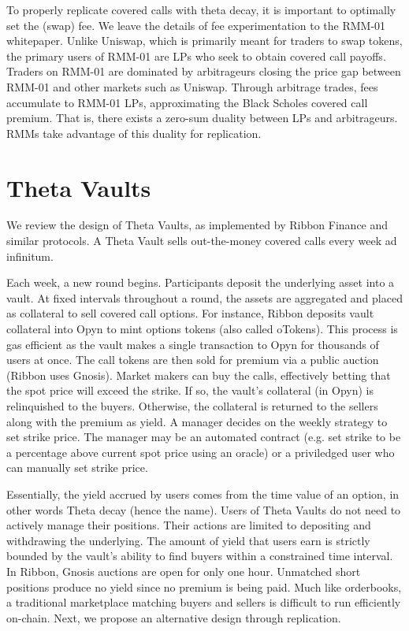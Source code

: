 \documentclass[hidelinks, 12pt]{article}
\begin{document}
To properly replicate covered calls with theta decay, it is important to optimally set the (swap) fee. We leave the details of fee experimentation to the RMM-01 whitepaper. Unlike Uniswap, which is primarily meant for traders to swap tokens, the primary users of RMM-01 are LPs who seek to obtain covered call payoffs. Traders on RMM-01 are dominated by arbitrageurs closing the price gap between RMM-01 and other markets such as Uniswap. Through arbitrage trades, fees accumulate to RMM-01 LPs, approximating the Black Scholes covered call premium. That is, there exists a zero-sum duality between LPs and arbitrageurs. RMMs take advantage of this duality for replication.

\section{Theta Vaults}
\label{sec:theta}

We review the design of Theta Vaults, as implemented by Ribbon Finance and similar protocols. A Theta Vault sells out-the-money covered calls every week ad infinitum.

Each week, a new round begins. Participants deposit the underlying asset into a vault. At fixed intervals throughout a round, the assets are aggregated and placed as collateral to sell covered call options. For instance, Ribbon deposits vault collateral into Opyn to mint options tokens (also called oTokens). This process is gas efficient as the vault makes a single transaction to Opyn for thousands of users at once. The call tokens are then sold for premium via a public auction (Ribbon uses Gnosis). Market makers can buy the calls, effectively betting that the spot price will exceed the strike. If so, the vault's collateral (in Opyn) is relinquished to the buyers. Otherwise, the collateral is returned to the sellers along with the premium as yield.
A manager decides on the weekly strategy to set strike price. The manager may be an automated contract (e.g. set strike to be a percentage above current spot price using an oracle) or a priviledged user who can manually set strike price.

Essentially, the yield accrued by users comes from the time value of an option, in other words Theta decay (hence the name). Users of Theta Vaults do not need to actively manage their positions. Their actions are limited to depositing and withdrawing the underlying. The amount of yield that users earn is strictly bounded by the vault's ability to find buyers within a constrained time interval. In Ribbon, Gnosis auctions are open for only one hour. Unmatched short positions produce no yield since no premium is being paid. Much like orderbooks, a traditional marketplace matching buyers and sellers is difficult to run efficiently on-chain. Next, we propose an alternative design through replication.
\end{document}
